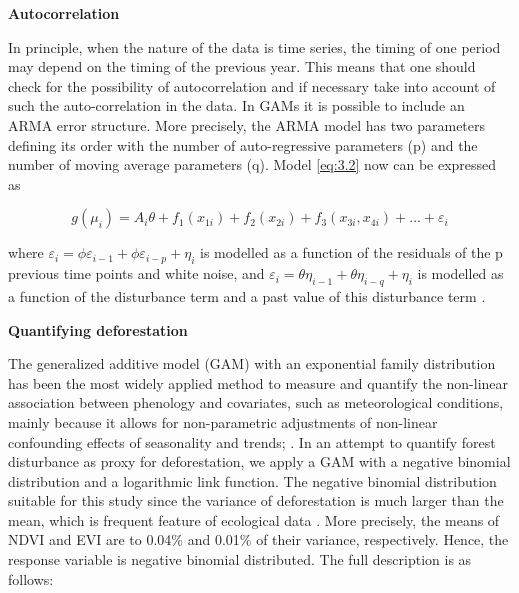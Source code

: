 


\textbf{Autocorrelation} %

In principle, when the nature of the data is time series, the timing of one period may depend on the timing of the previous year. This means that one should check for the possibility of autocorrelation and if necessary take into account of such the auto-correlation in the data. In GAMs it is possible to include an ARMA error structure. More precisely, the ARMA model has two parameters defining its order with the number of auto-regressive parameters (p) and the number of moving average parameters (q). Model \ref{eq:3.2} now can be expressed as


\begin{equation}  \label{eq:8.2} 
g(\mu_{i}) = A_{i} \theta + f_{1}(x_{1i}) + f_{2}(x_{2i}) + f_{3}(x_{3i},x_{4i}) + \dots + \varepsilon_{i}
\end{equation}

where $\varepsilon_{i} = {\phi}\varepsilon_{i-1} + {\phi}\varepsilon_{i-p} + \eta_{i} $ is modelled as a function of the residuals of the p previous time points and white noise, and $\varepsilon_{i} = {\theta}\eta_{i-1} + {\theta}\eta_{i-q} + \eta_{i}$ is modelled as a function of the disturbance term and a past value of this disturbance term \citep{zuur_saveliev_ieno_2014}.

\textbf{Quantifying deforestation} 

The generalized additive model (GAM) with an exponential family distribution has been the most widely applied method to measure and quantify the non-linear association between phenology and covariates, such as meteorological conditions, mainly because it allows for non-parametric adjustments of non-linear confounding effects of seasonality and trends; \citep{alkemad_1998,BELL_2015,JOYE_2015,LUSK_2016,SADAT_2016,HALPERIN_2016, SANTOS_2017,TAPIA_2017,LIU_2018,MORENO_2018}.  In an attempt to quantify forest disturbance as proxy for deforestation, we apply a GAM with a negative binomial distribution and a logarithmic link function. The negative binomial distribution suitable for this study since the variance of deforestation is much larger than the mean, which is frequent feature of ecological data \citep{zuur_2011}. More precisely, the means of NDVI and EVI are to 0.04\% and 0.01\% of their variance, respectively. Hence, the response variable is negative binomial distributed. The full description is as follows:

